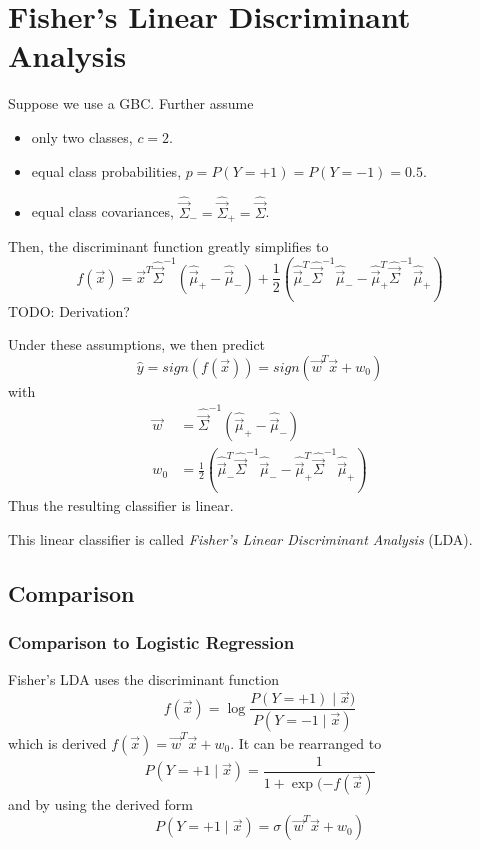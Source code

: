 \section{Fisher's Linear Discriminant Analysis}
Suppose we use a GBC.
Further assume
\begin{itemize}
    \item only two classes, $c = 2$.
    \item equal class probabilities,
    $p = P(Y = +1) = P(Y = -1) = 0.5$.
    \item equal class covariances,
    $\hat{\vec{\Sigma}}_- = \hat{\vec{\Sigma}}_+ = \hat{\vec{\Sigma}}$.
\end{itemize}

Then, the discriminant function greatly
simplifies to
\begin{equation*}
    f(\vec{x}) = 
    \vec{x}^T \hat{\vec{\Sigma}}^{-1}
    (\hat{\vec{\mu}}_+ - \hat{\vec{\mu}}_-)
    + \frac{1}{2}
    \left(
    \hat{\vec{\mu}}_-^T \hat{\vec{\Sigma}}^{-1} \hat{\vec{\mu}}_-
    -
    \hat{\vec{\mu}}_+^T \hat{\vec{\Sigma}}^{-1} \hat{\vec{\mu}}_+
    \right)
\end{equation*}
TODO: Derivation?

Under these assumptions, we then predict
\begin{equation*}
    \hat{y} = sign(f(\vec{x}))
    = sign(\vec{w}^T \vec{x} + w_0)
\end{equation*}
with
\begin{align*}
    \vec{w} &= \hat{\vec{\Sigma}}^{-1}
    (\hat{\vec{\mu}}_+ - \hat{\vec{\mu}}_-) \\
    w_0 &= \frac{1}{2}
    \left(
    \hat{\vec{\mu}}_-^T \hat{\vec{\Sigma}}^{-1} \hat{\vec{\mu}}_-
    -
    \hat{\vec{\mu}}_+^T \hat{\vec{\Sigma}}^{-1} \hat{\vec{\mu}}_+
    \right)
\end{align*}
Thus the resulting classifier is linear.

This linear classifier is called
\emph{Fisher's Linear Discriminant Analysis}
(LDA).


\subsection{Comparison}
\subsubsection{Comparison to Logistic Regression}
Fisher's LDA uses the discriminant function
\begin{equation*}
    f(\vec{x}) = \log{
        \frac{P(Y = +1) \mid \vec{x})}{P(Y = -1 \mid \vec{x})}
    }
\end{equation*}
which is derived
$f(\vec{x}) = \vec{w}^T \vec{x} + w_0$.
It can be rearranged to
\begin{equation*}
    P(Y = +1 \mid \vec{x}) = \frac{1}{1 + \exp{(-f(\vec{x})}}
\end{equation*}
and by using the derived form
\begin{equation*}
    P(Y = +1 \mid \vec{x}) = \sigma(\vec{w}^T \vec{x} + w_0)
\end{equation*}

